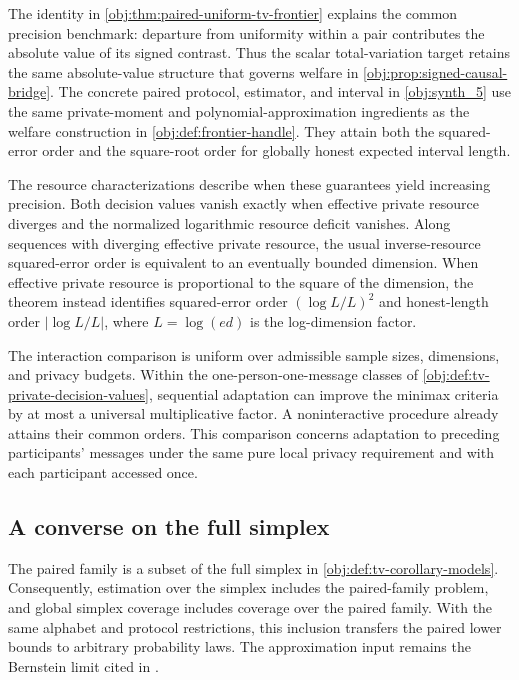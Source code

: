The identity in \cref{obj:thm:paired-uniform-tv-frontier} explains the common precision benchmark: departure from uniformity within a pair contributes the absolute value of its signed contrast. Thus the scalar total-variation target retains the same absolute-value structure that governs welfare in \cref{obj:prop:signed-causal-bridge}. The concrete paired protocol, estimator, and interval in \cref{obj:synth_5} use the same private-moment and polynomial-approximation ingredients as the welfare construction in \cref{obj:def:frontier-handle}. They attain both the squared-error order and the square-root order for globally honest expected interval length.

The resource characterizations describe when these guarantees yield increasing precision. Both decision values vanish exactly when effective private resource diverges and the normalized logarithmic resource deficit vanishes. Along sequences with diverging effective private resource, the usual inverse-resource squared-error order is equivalent to an eventually bounded dimension. When effective private resource is proportional to the square of the dimension, the theorem instead identifies squared-error order \((\log L/L)^2\) and honest-length order \(|\log L/L|\), where \(L=\log(ed)\) is the log-dimension factor.

The interaction comparison is uniform over admissible sample sizes, dimensions, and privacy budgets. Within the one-person-one-message classes of \cref{obj:def:tv-private-decision-values}, sequential adaptation can improve the minimax criteria by at most a universal multiplicative factor. A noninteractive procedure already attains their common orders. This comparison concerns adaptation to preceding participants' messages under the same pure local privacy requirement and with each participant accessed once.

\subsection{A converse on the full simplex}

The paired family is a subset of the full simplex in \cref{obj:def:tv-corollary-models}. Consequently, estimation over the simplex includes the paired-family problem, and global simplex coverage includes coverage over the paired family. With the same alphabet and protocol restrictions, this inclusion transfers the paired lower bounds to arbitrary probability laws. The approximation input remains the Bernstein limit cited in \citet[Section 3.1, p.~8]{CaiLow2011Nonsmooth}.


